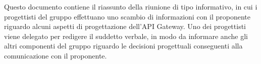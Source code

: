 Questo documento contiene il riassunto della riunione di tipo informativo, in cui i progettisti del gruppo effettuano uno scambio di informazioni con il proponente riguardo alcuni aspetti di progettazione dell'API Gateway. Uno dei progettisti viene delegato per redigere il suddetto verbale, in modo da informare anche gli altri componenti del gruppo riguardo le decisioni progettuali conseguenti alla comunicazione con il proponente.
